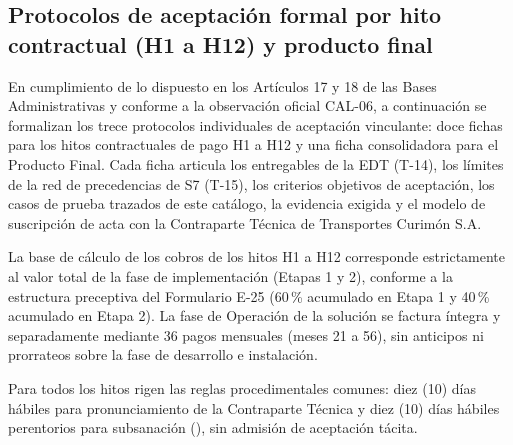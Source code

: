 
\subsection*{Protocolos de aceptación formal por hito contractual (H1 a H12) y producto final}\label{sec:9-protocolos-hitos}

En cumplimiento de lo dispuesto en los Artículos 17 y 18 de las Bases Administrativas y conforme a la observación oficial CAL-06, a continuación se formalizan los trece protocolos individuales de aceptación vinculante: doce fichas para los hitos contractuales de pago H1 a H12 y una ficha consolidadora para el Producto Final. Cada ficha articula los entregables de la EDT (T-14), los límites de la red de precedencias de S7 (T-15), los criterios objetivos de aceptación, los casos de prueba trazados de este catálogo, la evidencia exigida y el modelo de suscripción de acta con la Contraparte Técnica de Transportes Curimón S.A.

La base de cálculo de los cobros de los hitos H1 a H12 corresponde estrictamente al valor total de la fase de implementación (Etapas 1 y 2), conforme a la estructura preceptiva del Formulario E-25 (60\,\% acumulado en Etapa 1 y 40\,\% acumulado en Etapa 2). La fase de Operación de la solución se factura íntegra y separadamente mediante 36 pagos mensuales (meses 21 a 56), sin anticipos ni prorrateos sobre la fase de desarrollo e instalación.

Para todos los hitos rigen las reglas procedimentales comunes: diez (10) días hábiles para pronunciamiento de la Contraparte Técnica y diez (10) días hábiles perentorios para subsanación (), sin admisión de aceptación tácita.

